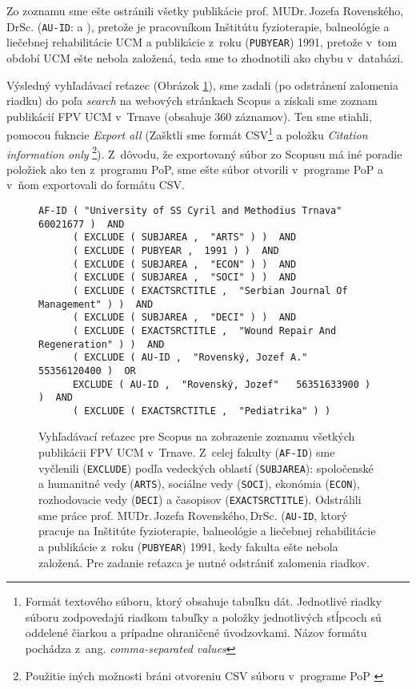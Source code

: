 Zo zoznamu sme ešte ostránili všetky publikácie  prof. MUDr.\,Jozefa
Rovenského,\,DrSc.  (\texttt{AU-ID}:  a ), pretože je pracovníkom Inštitútu fyzioterapie, balneológie a liečebnej
rehabilitácie UCM a publikácie z~roku (\texttt{PUBYEAR}) 1991, pretože v~tom
období UCM ešte nebola založená, teda sme to zhodnotili ako chybu v~databázi.

Výsledný vyhľadávací reťazec (Obrázok \ref{fig:scopus.query}), sme zadali (po
odstránení zalomenia riadku) do poľa \emph{search} na webových stránkach Scopus
a získali sme zoznam publikácií FPV UCM v~Trnave (obsahuje 360 záznamov). Ten
sme stiahli, pomocou fukncie \emph{Export all} (Zašktli sme formát
CSV\footnote{Formát textového súboru, ktorý obsahuje tabuľku dát. Jednotlivé
riadky súboru zodpovedajú riadkom tabuľky a položky jednotlivých stĺpcoch sú
oddelené čiarkou a prípadne ohraničené úvodzovkami.  Názov formátu pochádza
z~ang.  \emph{comma-separated values}} a položku \emph{Citation information
only} \footnote {Použitie iných možnosti bráni otvoreniu CSV súboru
v~programe PoP \citep{Harzing2011}}).  Z~dôvodu, že exportovaný súbor zo Scopusu má
iné poradie položiek ako ten z~programu PoP, sme ešte súbor otvorili v~programe
PoP a v~ňom exportovali do formátu CSV.


\begin{figure}
  \footnotesize
  \begin{Verbatim}[frame=single]
    AF-ID ( "University of SS Cyril and Methodius Trnava"   60021677 )  AND
      ( EXCLUDE ( SUBJAREA ,  "ARTS" ) )  AND
      ( EXCLUDE ( PUBYEAR ,  1991 ) )  AND
      ( EXCLUDE ( SUBJAREA ,  "ECON" ) )  AND
      ( EXCLUDE ( SUBJAREA ,  "SOCI" ) )  AND
      ( EXCLUDE ( EXACTSRCTITLE ,  "Serbian Journal Of Management" ) )  AND
      ( EXCLUDE ( SUBJAREA ,  "DECI" ) )  AND
      ( EXCLUDE ( EXACTSRCTITLE ,  "Wound Repair And Regeneration" ) )  AND
      ( EXCLUDE ( AU-ID ,  "Rovenský, Jozef A."   55356120400 )  OR
      EXCLUDE ( AU-ID ,  "Rovenský, Jozef"   56351633900 ) )  AND
      ( EXCLUDE ( EXACTSRCTITLE ,  "Pediatrika" ) )
  \end{Verbatim}
  \vspace*{-4mm}
  \caption[Vyhľahávaci reťazec pre celú fakultu pre Scopus]{Vyhľadávací reťazec
  pre Scopus na zobrazenie zoznamu všetkých publikácii FPV UCM v~Trnave.
  Z~celej fakulty (\texttt{AF-ID})
  sme vyčlenili (\texttt{EXCLUDE}) podľa vedeckých oblastí (\texttt{SUBJAREA}):
  spoločenské a humanitné vedy (\texttt{ARTS}), sociálne vedy (\texttt{SOCI}),
  ekonómia (\texttt{ECON}), rozhodovacie vedy (\texttt{DECI}) a časopisov
  (\texttt{EXACTSRCTITLE}).  Odstrálili sme práce prof. MUDr.\,Jozefa
  Rovenského,\,DrSc.  (\texttt{AU-ID}, ktorý pracuje na Inštitúte fyzioterapie,
  balneológie a liečebnej rehabilitácie a publikácie z~roku (\texttt{PUBYEAR})
  1991, kedy fakulta ešte nebola založená. Pre zadanie reťazca je nutné
  odstrániť zalomenia riadkov.}
  \label{fig:scopus.query}
\end{figure}


